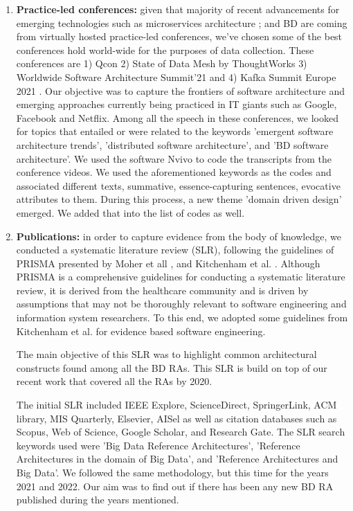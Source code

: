 \documentclass[review]{elsarticle}
\begin{document}
\begin{enumerate}
    \item{\bf{Practice-led conferences:}} given that majority of recent advancements for emerging technologies such as microservices architecture \cite{gan2019open};\cite{laigner2021data} \cite{dragoni2017microservices} and BD are coming from virtually hosted practice-led conferences, we've chosen some of the best conferences hold world-wide for the purposes of data collection. These conferences are 1) Qcon \cite{QCON} 2) State of Data Mesh by ThoughtWorks \cite{ThoughtWorks} 3) Worldwide Software Architecture Summit'21 \cite{Geekle} and 4) Kafka Summit Europe 2021 \cite{KafkaSummit}. Our objective was to capture the frontiers of software architecture and emerging approaches currently being practiced in IT giants such as Google, Facebook and Netflix. Among all the speech in these conferences, we looked for topics that entailed or were related to the keywords 'emergent software architecture trends', 'distributed software architecture', and 'BD software architecture'. We used the software Nvivo to code the transcripts from the conference videos. We used the aforementioned keywords as the codes and associated different texts, summative, essence-capturing sentences, evocative attributes to them. During this process, a new theme 'domain driven design' emerged. We added that into the list of codes as well.
    
    \item{\bf{Publications:}} in order to capture evidence from the body of knowledge, we conducted a systematic literature review (SLR), following the guidelines of PRISMA presented by Moher et all \cite{moher2015preferred}, and Kitchenham et al. \cite{kitchenham2015evidence}. Although PRISMA is a comprehensive guidelines for conducting a systematic literature review, it is derived from the healthcare community and is driven by assumptions that may not be thoroughly relevant to software engineering and information system researchers. To this end, we adopted some guidelines from Kitchenham et al. for evidence based software engineering.
    
    The main objective of this SLR was to highlight common architectural constructs found among all the BD RAs. This SLR is build on top of our recent work \cite{AtaeiACIS} that covered all the RAs by 2020.

    The initial SLR included IEEE Explore, ScienceDirect, SpringerLink, ACM library, MIS Quarterly, Elsevier, AISel as well as citation databases such as Scopus, Web of Science, Google Scholar, and Research Gate. The SLR search keywords used were ’Big Data Reference Architectures’, ’Reference Architectures in the domain of Big Data’, and ’Reference Architectures and Big Data’. We followed the same methodology, but this time for the years 2021 and 2022. Our aim was to find out if there has been any new BD RA published during the years mentioned.


\end{enumerate}
\end{document}
